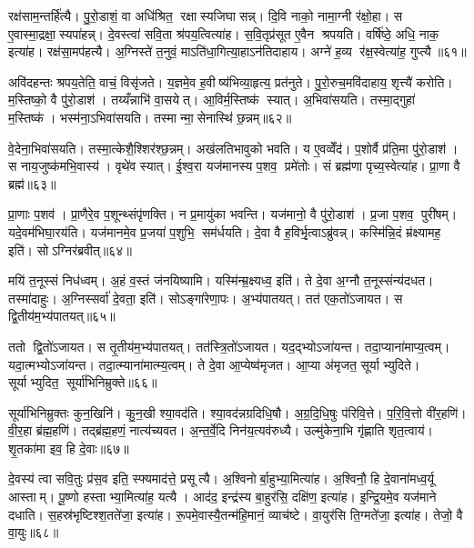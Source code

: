 रक्ष॑साम॒न्तर्\mbox{}हि॑त्यै। पु॒रो॒डाशं॒ वा अधि॑श्रित॒ रक्षास्यजिघासन्न्। दि॒वि नाको॒ नामा॒ग्नी र॑क्षो॒हा। स ए॒वास्मा॒द्रक्षा॒स्यपा॑हन्न्। दे॒वस्त्वा॑ सवि॒ता श्र॑पय॒त्वित्या॑ह। स॒वि॒तृप्र॑सूत ए॒वैन श्रपयति। वर्\mbox{}षि॑ष्ठे॒ अधि॒ नाक॒ इत्या॑ह। रक्ष॑सा॒मप॑हत्यै। अ॒ग्निस्ते॑ त॒नुवं॒ माऽति॑धा॒गित्या॒हाऽन॑तिदाहाय। अग्ने॑ ह॒व्य र॑क्ष॒स्वेत्या॑ह॒ गुप्त्यै॥६१॥

अवि॑दहन्तः श्रपय॒तेति॒ वाचं॒ विसृ॑जते। य॒ज्ञमे॒व ह॒वीष्य॑भिव्या॒हृत्य॒ प्रत॑नुते। पु॒रो॒रुच॒मवि॑दाहाय॒ शृत्त्यै॑ करोति। म॒स्तिष्को॒ वै पु॑रो॒डाश॑। तय्यँन्नाभि॑ वा॒सयेत्। आ॒विर्म॒स्तिष्क॑ स्यात्। अ॒भिवा॑सयति। तस्मा॒द्गुहा॑ म॒स्तिष्क॑। भस्म॑ना॒ऽभिवा॑सयति। तस्मान्मा॒सेनास्थि॑ छ॒न्नम्॥६२॥

वे॒देना॒भिवा॑सयति। तस्मा॒त्केशै॒श्शिर॑श्छ॒न्नम्। अख॑लतिभावुको भवति। य ए॒वव्वेँद॑। प॒शोर्वै प्र॑ति॒मा पु॑रो॒डाश॑। स नाय॒जुष्क॑मभि॒वास्य॑। वृथे॑व स्यात्। ई॒श्व॒रा यज॑मानस्य प॒शव॒ प्रमे॑तोः। सं ब्रह्म॑णा पृच्य॒स्वेत्या॑ह। प्रा॒णा वै ब्रह्म॑॥६३॥

प्रा॒णाः प॒शव॑। प्रा॒णैरे॒व प॒शून्थ्संपृ॑णक्ति। न प्र॒मायु॑का भवन्ति। यज॑मानो॒ वै पु॑रो॒डाश॑। प्र॒जा प॒शव॒ पुरी॑षम्। यदे॒वम॑भिघा॒रय॑ति। यज॑मानमे॒व प्र॒जया॑ प॒शुभि॒ सम॑र्धयति। दे॒वा वै ह॒विर्भृ॒त्वाऽब्रु॑वन्न्। कस्मि॑न्नि॒दं म्र॑क्ष्यामह॒ इति॑। सोऽग्निर॑ब्रवीत्॥६४॥

मयि॑ त॒नूस्सं निध॑ध्वम्। अ॒हं व॒स्तं ज॑नयिष्यामि। यस्मि॑न्म्र॒क्ष्यध्व॒ इति॑। ते दे॒वा अ॒ग्नौ त॒नूस्संन्य॑दधत। तस्मा॑दाहुः। अ॒ग्निस्सर्वा॑ दे॒वता॒ इति॑। सोऽङ्गा॑रेणा॒पः। अ॒भ्य॑पातयत्। तत॑ एक॒तो॑ऽजायत। स द्वि॒तीय॑म॒भ्य॑पातयत्॥६५॥

ततो द्वि॒तो॑ऽजायत। स तृ॒तीय॑म॒भ्य॑पातयत्। तत॑स्त्रि॒तो॑ऽजायत। यद॒द्भ्योऽजा॑यन्त। तदा॒प्याना॑माप्य॒त्वम्। यदा॒त्मभ्योऽजा॑यन्त। तदा॒त्म्याना॑मात्म्य॒त्वम्। ते दे॒वा आ॒प्येष्व॑मृजत। आ॒प्या अ॑मृजत॒ सूर्याभ्युदिते। सूर्याभ्युदित॒ सूर्या॑भिनिम्रुक्ते॥६६॥

सूर्या॑भिनिम्रुक्तः कुन॒खिनि॑। कु॒न॒खी श्या॒वद॑ति। श्या॒वद॑न्नग्रदिधि॒षौ। अ॒ग्र॒दि॒धि॒षुः प॑रिवि॒त्ते। प॒रि॒वि॒त्तो वी॑र॒हणि॑। वी॒र॒हा ब्र॑ह्म॒हणि॑। तद्ब्र॑ह्म॒हणं॒ नात्य॑च्यवत। अ॒न्त॒र्वे॒दि निन॑य॒त्यव॑रुध्यै। उल्मु॑केना॒भि गृ॑ह्णाति शृत॒त्वाय॑। शृ॒तका॑मा इव॒ हि दे॒वाः॥६७॥\anuvakamend[अ॒न्या जि॑न्वन्त्यनु वि॒सृत्यै॒वमा॒हाशान्त आह॒ गुप्त्यै॑ छ॒न्नं ब्रह्माब्रवीद्द्वि॒तीय॑म॒भ्य॑पातय॒थ्सूर्या॑भिनिम्रुक्ते दे॒वाः]

दे॒वस्य॑ त्वा सवि॒तुः प्र॑स॒व इति॒ स्फ्यमाद॑त्ते॒ प्रसूत्यै। अ॒श्विनोर्बा॒हुभ्या॒मित्या॑ह। अ॒श्विनौ॒ हि दे॒वाना॑मध्व॒र्यू आस्ताम्। पू॒ष्णो हस्ताभ्या॒मित्या॑ह॒ यत्यै। आद॑द॒ इन्द्र॑स्य बा॒हुर॑सि॒ दक्षि॑ण॒ इत्या॑ह। इ॒न्द्रि॒यमे॒व यज॑माने दधाति। स॒हस्र॑भृष्टिश्श॒तते॑जा॒ इत्या॑ह। रू॒पमे॒वास्यै॒तन्म॑हि॒मानं॒ व्याच॑ष्टे। वा॒युर॑सि ति॒ग्मते॑जा॒ इत्या॑ह। तेजो॒ वै वा॒युः॥६८॥

